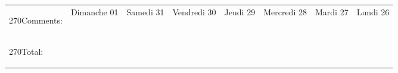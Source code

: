 \documentclass[11pt,a4paper,landscape]{article} %
\newlength{\daycellwidth}
\newlength{\countcellwidth}
\newlength{\daycellheight}
\newcommand{\textindaycell}[1]{%
\hspace{0.9\daycellheight}\begin{turn}{270}#1\end{turn}%
}
\begin{document}
\begin{tabular}{|p{\daycellheight}|*{7}{p{\daycellheight}|}} \hline
\multirow{2}{*}{\textindaycell{Comments:}}
 & Dimanche 01 & Samedi 31 & Vendredi 30 & Jeudi 29 & Mercredi 28 & Mardi 27 & Lundi 26 \\ \cline{2-8}
 & \vspace{\daycellwidth}\phantom{c}   &  &  &  &  &  &  \\ \hline \hline
\textindaycell{Total:} & \vspace{\countcellwidth}\phantom{c} &  &  &  &  &  &  \\ \hline
\end{tabular}
\end{document}
